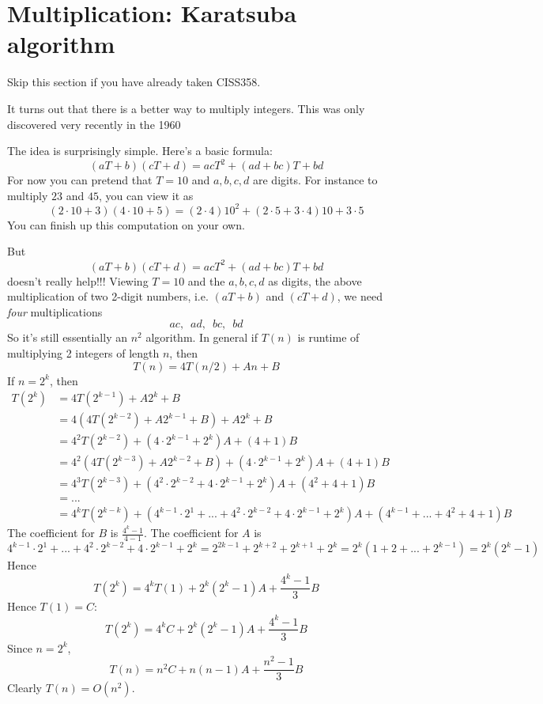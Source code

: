 \section{Multiplication: Karatsuba algorithm}

Skip this section if you have already taken CISS358.

It turns out that there is a better way to multiply integers.
This was only discovered very recently in the 1960 

The idea is surprisingly simple.
Here's a basic formula:
\[
(aT + b)(cT + d) = acT^2 + (ad + bc)T + bd
\]
For now you can pretend that $T = 10$ and $a,b,c,d$ are digits.
For instance to multiply $23$ and $45$, you can view it as
\[
(2 \cdot 10 + 3)(4 \cdot 10 + 5)
= (2 \cdot 4) 10^2 + (2 \cdot 5 + 3 \cdot 4) 10 + 3 \cdot 5
\]
You can finish up this computation on your own.

But 
\[
(aT + b)(cT + d) = acT^2 + (ad + bc)T + bd
\]
doesn't really help!!!
Viewing $T = 10$ and the $a,b,c,d$ as digits, the above
multiplication of two 2-digit numbers, i.e. 
$(aT + b)$ and $(cT + d)$, we need
\textit{ four} multiplications
\[
ac, \,\,\, 
ad, \,\,\,
bc, \,\,\,
bd
\]
So it's still essentially an $n^2$ algorithm.
In general if $T(n)$ is runtime of multiplying 2 integers of length $n$,
then
\[
T(n) = 4T(n/2) + An + B
\]
If $n = 2^k$, then
\begin{align*}
T(2^k) &= 4T(2^{k-1}) + A2^k + B \\
&= 4(4T(2^{k-2}) + A2^{k-1} + B) + A2^k + B \\
&= 4^2T(2^{k-2}) + (4 \cdot 2^{k-1} + 2^k)A + (4 + 1) B \\
&= 4^2(4T(2^{k-3}) + A2^{k-2} + B) + (4 \cdot 2^{k-1} + 2^k)A + (4 + 1)B \\
&= 4^3T(2^{k-3}) + (4^2 \cdot 2^{k-2} + 4 \cdot 2^{k-1} + 2^k)A + (4^2 + 4 + 1)B \\
&= ... \\
&= 4^kT(2^{k-k}) + (4^{k-1} \cdot 2^{1} + ... + 4^2 \cdot 2^{k-2} + 4 \cdot 2^{k-1} + 2^k)A + (4^{k-1} + ... + 4^2 + 4 + 1)B
\end{align*}
The coefficient for $B$ is $\displaystyle \frac{4^k - 1}{4 - 1}$.
The coefficient for $A$ is
\[
4^{k-1} \cdot 2^{1} + ... + 4^2 \cdot 2^{k-2} + 4 \cdot 2^{k-1} + 2^k
=
2^{2k - 1}
+ 2^{k + 2}
+ 2^{k + 1}
+ 2^k
= 2^k(1 + 2 + ... + 2^{k-1})
= 2^k(2^k - 1)
\]
Hence
\[
T(2^k) = 4^k T(1) + 2^k(2^k - 1) A + \frac{4^k - 1}{3} B
\]
Hence $T(1) = C$:
\[
T(2^k) = 4^k C + 2^k(2^k - 1) A + \frac{4^k - 1}{3} B
\]
Since $n = 2^k$,
\[
T(n) = n^2 C + n(n - 1) A + \frac{n^2 - 1}{3} B
\]
Clearly $T(n) = O(n^2)$.

